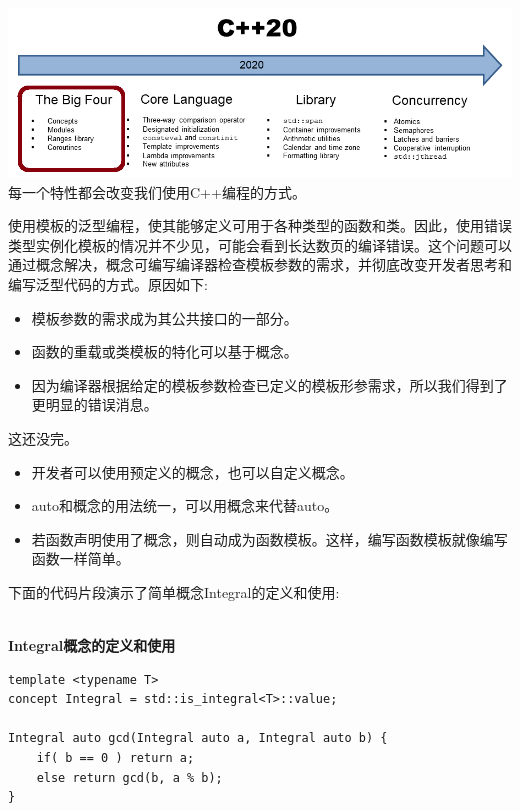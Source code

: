 


\begin{center}
\includegraphics[width=1.0\textwidth]{content/2/chapter3/images/2.png}\\
每一个特性都会改变我们使用C++编程的方式。
\end{center}


使用模板的泛型编程，使其能够定义可用于各种类型的函数和类。因此，使用错误类型实例化模板的情况并不少见，可能会看到长达数页的编译错误。这个问题可以通过概念解决，概念可编写编译器检查模板参数的需求，并彻底改变开发者思考和编写泛型代码的方式。原因如下:

\begin{itemize}
\item 
模板参数的需求成为其公共接口的一部分。

\item 
函数的重载或类模板的特化可以基于概念。

\item 
因为编译器根据给定的模板参数检查已定义的模板形参需求，所以我们得到了更明显的错误消息。
\end{itemize}

这还没完。

\begin{itemize}
\item 
开发者可以使用预定义的概念，也可以自定义概念。

\item 
auto和概念的用法统一，可以用概念来代替auto。

\item 
若函数声明使用了概念，则自动成为函数模板。这样，编写函数模板就像编写函数一样简单。
\end{itemize}

下面的代码片段演示了简单概念Integral的定义和使用:

\hspace*{\fill} \\ %
\noindent
\textbf{Integral概念的定义和使用}
\begin{lstlisting}[style=styleCXX]
template <typename T>
concept Integral = std::is_integral<T>::value;

Integral auto gcd(Integral auto a, Integral auto b) {
	if( b == 0 ) return a;
	else return gcd(b, a % b);
}
\end{lstlisting}

